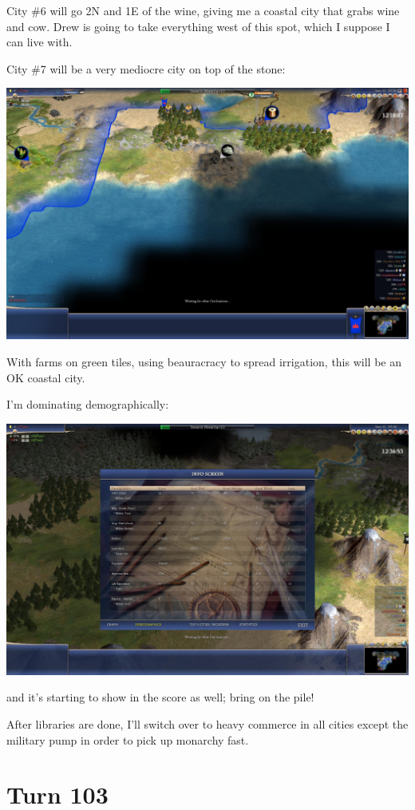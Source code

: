 \documentclass[10pt]{article}
\begin{document}
City \#6 will go 2N and 1E of the wine, giving me a coastal city that
grabs wine and cow. Drew is going to take everything west of this
spot, which I suppose I can live with.

City \#7 will be a very mediocre city on top of the stone:

\includegraphics[width=1.0\textwidth]{turn90-2}

With farms on green tiles, using beauracracy to spread irrigation, this will be an OK coastal city.

I'm dominating demographically:

\includegraphics[width=1.0\textwidth]{turn90-3}

and it's starting to show in the score as well; bring on the pile!

After libraries are done, I'll switch over to heavy commerce in all cities except the military pump in order to pick up monarchy fast.

\section*{Turn 103}
\end{document}
